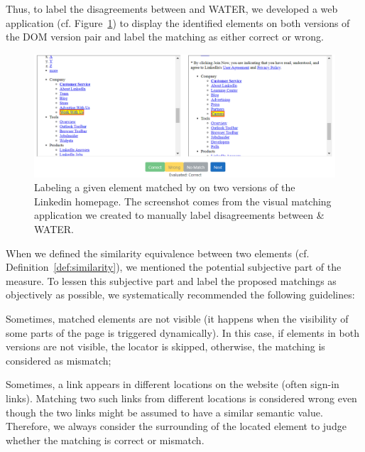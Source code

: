 Thus, to label the disagreements between \erratum{} and WATER, we developed a web application (cf. Figure~\ref{fig:disagreement}) to display the identified elements on both versions of the DOM version pair and label the matching as either correct or wrong.

\begin{figure}
  \begin{center}
  \includegraphics[width=1.1\linewidth]{erratum/disagreement}
  \caption{Labeling a given element matched by \erratum{} on two versions of the \textsf{Linkedin} homepage. The screenshot comes from the visual matching application we created to manually label disagreements between \erratum{} \& WATER.}
  \label{fig:disagreement}
  \end{center}
\end{figure}

When we defined the similarity equivalence between two elements (cf. Definition~\ref{def:similarity}), we mentioned the potential subjective part of the measure.
To lessen this subjective part and label the proposed matchings as objectively as possible, we systematically recommended the following guidelines:
\begin{compactenum}
    \item Sometimes, matched elements are not visible (it happens when the visibility of some parts of the page is triggered dynamically).
    In this case, if elements in both versions are not visible, the locator is skipped, otherwise, the matching is considered as \textsf{mismatch};
    \item Sometimes, a link appears in different locations on the website (often sign-in links).
    Matching two such links from different locations is considered wrong even though the two links might be assumed to have a similar semantic value.
    Therefore, we always consider the surrounding of the located element to judge whether the matching is \textsf{correct} or \textsf{mismatch}.
\end{compactenum}


